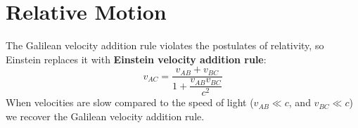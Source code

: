 %
%  
%
%
%
%
%
\section{Relative Motion}

The Galilean velocity addition rule violates the postulates of relativity,
so Einstein replaces it with \textbf{Einstein velocity addition rule}:
\begin{equation}  
  \boxed{v_{AC}=\frac{v_{AB}+v_{BC}}{1+\dfrac{v_{AB}v_{BC}}{c^2}}}
\end{equation}
When velocities are slow compared to the speed of light ($v_{AB}\ll c$, and
$v_{BC}\ll c$) we recover the Galilean velocity addition rule.


%
%
%

